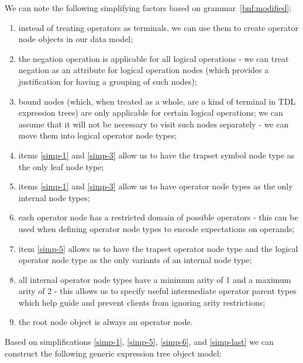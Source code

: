 \documentclass[12pt,oneside,a4paper,notitlepage]{report}
\begin{document}
	\par We can note the following simplifying factors based on grammar~\ref{bnf:modified}:
	\begin{enumerate}[label=\textbf{\arabic*.},ref=\textit{\arabic*}]
		\item \label{simp-1} instead of treating operators as terminals, we can use them to create operator node objects in our data model;
		\item \label{simp-2} the negation operation is applicable for all logical operations - we can treat negation as an attribute for logical operation nodes (which provides a justification for having a grouping of such nodes);
		\item \label{simp-3} bound nodes (which, when treated as a whole, are a kind of terminal in TDL expression trees) are only applicable for certain logical operations; we can assume that it will not be necessary to visit such nodes separately - we can move them into logical operator node types;
		\item \label{simp-4} items \ref{simp-1} and \ref{simp-3} allow us to have the trapset symbol node type as the only leaf node type;
		\item \label{simp-5} items \ref{simp-1} and \ref{simp-3} allow us to have operator node types as the only internal node types;
		\item \label{simp-6} each operator node has a restricted domain of possible operators - this can be used when defining operator node types to encode expectations on operands;
		\item \label{simp-7} item \ref{simp-5} allows us to have the trapset operator node type and the logical operator node type as the only variants of an internal node type;
		\item \label{simp-8} all internal operator node types have a minimum arity of 1 and a maximum arity of 2 - this allows us to specify useful intermediate operator parent types which help guide and prevent clients from ignoring arity restrictions;
		\item \label{simp-last} the root node object is always an operator node.
	\end{enumerate}

	\newpage

	\par Based on simplifications \ref{simp-1}, \ref{simp-5}, \ref{simp-6}, and \ref{simp-last} we can construct the following generic expression tree object model:
	
\end{document}
